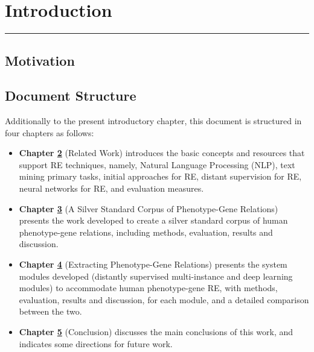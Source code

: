 \hypertarget{1}{}

\chapter{Introduction}


\vspace{-1.6cm}

\begingroup
\color{gray}
\par\noindent\rule{\textwidth}{0.4pt}
\endgroup



\section{Motivation}


\section{Document Structure}

Additionally to the present introductory chapter, this document is structured in four chapters as follows:

\begin{itemize}
   \item \textbf{Chapter \hyperlink{2}{2}} (Related Work) introduces the basic concepts and resources that support RE techniques, namely, Natural Language Processing (NLP), text mining primary tasks, initial approaches for RE, distant supervision for RE, neural networks for RE, and evaluation measures.
   \item \textbf{Chapter \hyperlink{3}{3}} (A Silver Standard Corpus of Phenotype-Gene Relations) presents the work developed to create a silver standard corpus of human phenotype-gene relations, including methods, evaluation, results and discussion.
   \item \textbf{Chapter \hyperlink{4}{4}} (Extracting Phenotype-Gene Relations) presents the system modules developed (distantly supervised multi-instance and deep learning modules) to accommodate human phenotype-gene RE, with methods, evaluation, results and discussion, for each module, and a detailed comparison between the two.
   \item \textbf{Chapter \hyperlink{5}{5}} (Conclusion) discusses the main conclusions of this work, and indicates some directions for future work.
\end{itemize}